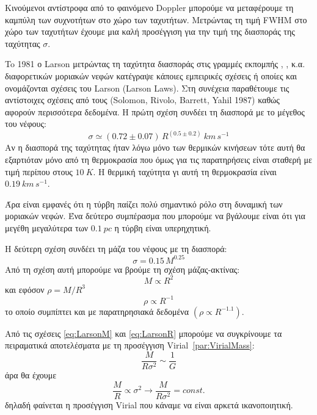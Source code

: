 \documentclass[a4paper,11pt]{memoir}
\begin{document}
Κινούμενοι αντίστροφα από το φαινόμενο Doppler μπορούμε να μεταφέρουμε τη καμπύλη των συχνοτήτων στο χώρο των ταχυτήτων. Μετρώντας τη τιμή FWHM στο χώρο των ταχυτήτων έχουμε μια καλή προσέγγιση για την τιμή της  διασποράς της ταχύτητας $\sigma$.

To 1981 ο Larson μετρώντας τη ταχύτητα διασποράς στις γραμμές εκπομπής , ,  κ.α. διαφορετικών μοριακών νεφών κατέγραψε κάποιες εμπειρικές σχέσεις ή οποίες και ονομάζονται σχέσεις του Larson (Larson Laws). Στη συνέχεια παραθέτουμε τις αντίστοιχες σχέσεις από τους (Solomon, Rivolo, Barrett, Yahil 1987) καθώς αφορούν περισσότερα δεδομένα.
Η πρώτη σχέση συνδέει τη διασπορά με το μέγεθος του νέφους:
\begin{equation}
\label{eq:LarsonR}
\sigma \simeq (0.72 \pm 0.07)\, R^{(0.5 \pm 0.2)} \ km\, s^{-1}
\end{equation} 
Αν η διασπορά της ταχύτητας ήταν λόγω μόνο των θερμικών κινήσεων τότε αυτή θα εξαρτιόταν μόνο από τη θερμοκρασία που όμως για τις παρατηρήσεις είναι σταθερή με τιμή περίπου στους $10 \ K$. Η θερμική ταχύτητα γι αυτή τη θερμοκρασία είναι $0.19\ km\, s^{-1}$.

Άρα είναι εμφανές ότι η τύρβη παίζει πολύ σημαντικό ρόλο στη δυναμική των μοριακών νεφών. Ένα δεύτερο συμπέρασμα που μπορούμε να βγάλουμε είναι ότι για μεγέθη μεγαλύτερα των $0.1 \ pc$ η τύρβη είναι υπερηχητική.

Η δεύτερη σχέση συνδέει τη μάζα του νέφους με τη διασπορά:
\begin{equation}
\label{eq:LarsonM}
\sigma = 0.15\, M^{0.25}
\end{equation}
Από τη σχέση αυτή μπορούμε να βρούμε τη σχέση μάζας-ακτίνας:
\begin{equation}
M\propto R^2
\end{equation}
και εφόσον $\rho = M/R^3$
\begin{equation}
\label{eq:Larsonrho}
\rho \propto R^{-1}
\end{equation}
το οποίο συμπίπτει και με παρατηρησιακά δεδομένα $(\rho \propto R^{-1.1})$.
\medskip

Από τις σχέσεις \ref{eq:LarsonM} και \ref{eq:LarsonR} μπορούμε να συγκρίνουμε τα πειραματικά αποτελέσματα με τη προσέγγιση Virial~\ref{par:VirialMass}: 
$$
\frac{M}{R \sigma ^2}\sim \frac{1}{G}
$$
άρα θα έχουμε
\begin{equation}
\frac{M}{R}\propto \sigma ^2 \rightarrow \frac{M}{R \sigma ^2}=const.
\end{equation}
δηλαδή φαίνεται η προσέγγιση Virial που κάναμε να είναι αρκετά ικανοποιητική.
\end{document}
